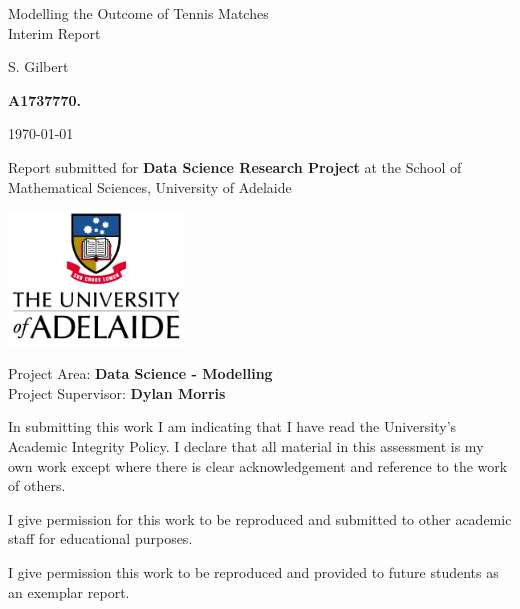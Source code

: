 \documentclass[12pt,a4paper]{article}
\newcommand{\titlestr}{Modelling the Outcome of Tennis Matches \\ Interim Report}
\newcommand{\authorstr}{S. Gilbert} %
\begin{document}
\begin{titlepage}
  \centering

  {\LARGE \titlestr \par}

  \vspace{1cm}
  {\Large \authorstr \par}

  {\bf A1737770.}

  \vspace{1cm}
  \today     %

  \vspace{2cm}
  Report submitted for
    {\bf Data Science Research Project}
  at the School of Mathematical Sciences,
  University of Adelaide

  \includegraphics[width=0.35\textwidth]{UoA_logo_col_vert.jpg}

  \vspace{2cm}
  \flushleft
  Project Area: {\bf Data Science - Modelling} \\
  Project Supervisor: {\bf Dylan Morris} \\

  \vspace{5mm} {\footnotesize In submitting this work I am indicating
    that I have read the University's Academic Integrity Policy. I
    declare that all material in this assessment is my own work except
    where there is clear acknowledgement and reference to the work of
    others.\par}

  \vspace{5mm} {\footnotesize I give permission for this work
    to be reproduced and submitted to other academic staff for
    educational purposes.\par}

  \vspace{5mm} {\footnotesize I give permission this work
    to be reproduced and provided to future students as an exemplar report.\par}

  \vfill
\end{titlepage}
\end{document}
